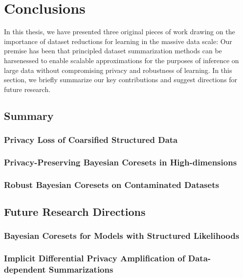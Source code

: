 \chapter{Conclusions}
\label{chap:chap6}
\renewcommand*{\MyPath}{../Chapter6}%

In this thesis, we have presented three original pieces of work drawing on the importance of dataset reductions for learning in the massive data scale: Our premise has been that principled dataset summarization methods can be harsenessed to enable scalable approximations for the purposes of inference on large data without compromising privacy and robustness of learning.
In this section, we briefly summarize our key contributions and suggest directions for future research.

\section{Summary}
\label{sec:summary}

\subsection{Privacy Loss of Coarsified Structured Data}
\label{subsec:ch3-summary}


\subsection{Privacy-Preserving Bayesian Coresets in High-dimensions}
\label{subsec:ch4-summary}

\subsection{Robust Bayesian Coresets on Contaminated Datasets}
\label{subsec:ch4-summary}


\section{Future Research Directions}
\label{sec:future-research-directions}

\subsection{Bayesian Coresets for Models with Structured Likelihoods}
\label{subsec:structure-liks}

\subsection{Implicit Differential Privacy Amplification of Data-dependent Summarizations}
\label{subsec:implicit-dp-amplification}

